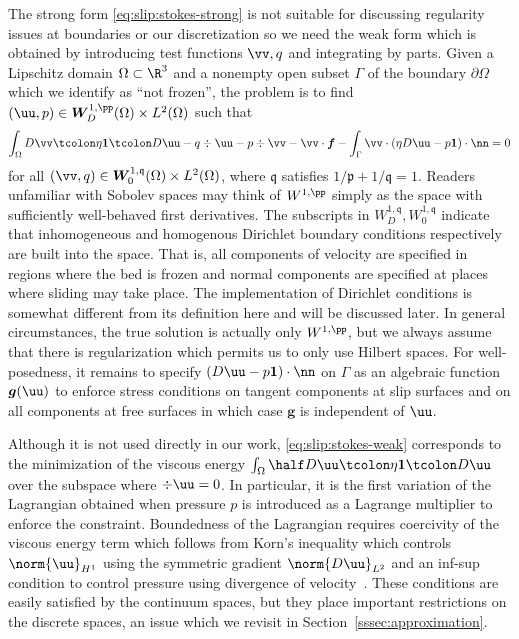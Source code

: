 The strong form \eqref{eq:slip:stokes-strong} is not suitable for discussing regularity issues at boundaries or our discretization so we need the weak form which is obtained by introducing test functions $\vv,q$ and integrating by parts.
Given a Lipschitz domain $\Omega \subset \R^3$ and a nonempty open subset $\Gamma$ of the boundary $\partial\Omega$ which we identify as ``not frozen'', the problem is to find $(\uu,p) \in \bm W_D^{1,\pp}(\Omega) \times L^2(\Omega)$ such that
\begin{multline}\label{eq:slip:stokes-weak}
  \int_\Omega D\vv\tcolon \eta\bm 1 \tcolon D\uu - q\div\uu - p\div\vv - \vv\cdot\bm f
  - \int_\Gamma \vv\cdot (\eta D\uu - p\bm 1)\cdot\nn = 0
\end{multline}
for all $(\vv,q)\in \bm W_0^{1,\mathfrak{q}}(\Omega) \times L^2(\Omega)$, where $\mathfrak q$ satisfies $1/\mathfrak p + 1/\mathfrak q = 1$.
Readers unfamiliar with Sobolev spaces may think of $W^{1,\pp}$ simply as the space with sufficiently well-behaved first derivatives.
The subscripts in $W_D^{1,\mathfrak{q}},W_0^{1,\mathfrak{q}}$ indicate that inhomogeneous and homogenous Dirichlet boundary conditions respectively are built into the space.
That is, all components of velocity are specified in regions where the bed is frozen and normal components are specified at places where sliding may take place.
The implementation of Dirichlet conditions is somewhat different from its definition here and will be discussed later.
In general circumstances, the true solution is actually only $W^{1,\pp}$, but we always assume that there is regularization which permits us to only use Hilbert spaces.
For well-posedness, it remains to specify $(D\uu - p\bm 1)\cdot\nn$ on $\Gamma$ as an algebraic function $\bm g(\uu)$ to enforce stress conditions on tangent components at slip surfaces and on all components at free surfaces in which case $\bm g$ is independent of $\uu$.

Although it is not used directly in our work, \eqref{eq:slip:stokes-weak} corresponds to the minimization of the viscous energy $\int_\Omega \half D\uu\tcolon \eta\bm 1 \tcolon D\uu$ over the subspace where $\div\uu = 0$.
In particular, it is the first variation of the Lagrangian obtained when pressure $p$ is introduced as a Lagrange multiplier to enforce the constraint.
Boundedness of the Lagrangian requires coercivity of the viscous energy term which follows from Korn's inequality which controls $\norm{\uu}_{H^1}$ using the symmetric gradient $\norm{D\uu}_{L^2}$
and an inf-sup condition to control pressure using divergence of velocity~\cite{evans1998partial,brenner2008mathematical}.
These conditions are easily satisfied by the continuum spaces, but they place important restrictions on the discrete spaces, an issue which we revisit in Section~\ref{sssec:approximation}.

